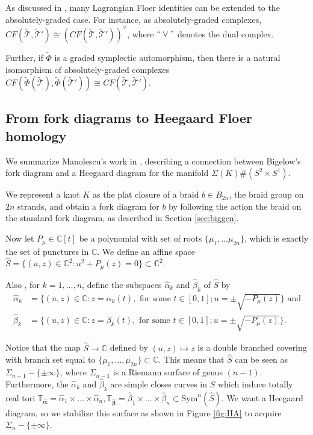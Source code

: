 \documentclass[11pt]{article}
\theoremstyle{plain} \newtheorem{thm}{Theorem}[subsection]
\theoremstyle{plain} \newtheorem{cor}[thm]{Corollary}
\theoremstyle{plain} \newtheorem{prop}[thm]{Proposition}
\theoremstyle{plain} \newtheorem{conj}[thm]{Conjecture}
\theoremstyle{plain} \newtheorem{lem}[thm]{Lemma}
\theoremstyle{definition} \newtheorem{df}[thm]{Definition}
\theoremstyle{remark} \newtheorem{rmk}[thm]{Remark}
\theoremstyle{remark} \newtheorem{obs}[thm]{Observation}
\newcommand{\B}[1]{B_{#1} }
\newcommand{\DBCs}[1]{\Sigma(#1)\#(S^{2}\times S^{1})}
\newcommand{\tld}[1]{\widetilde{#1}}
\newcommand{\ah}{\widehat{\alpha}}
\newcommand{\bh}{\widehat{\beta}}
\newcommand{\ba}{\boldsymbol{\alpha}}
\newcommand{\bb}{\boldsymbol{\beta}}
\newcommand{\bah}{\widehat{\ba}}
\newcommand{\bbh}{\widehat{\bb}}
\newcommand{\Tah}{\mathbb{T}_{\bah}}
\newcommand{\Tbh}{\mathbb{T}_{\bbh}}
\begin{document}
As discussed in \cite{s:GL}, many Lagrangian Floer identities can be extended to the absolutely-graded case.  For instance, as absolutely-graded complexes, $CF(\tld{\mathcal{T}}, \tld{\mathcal{T}}') \cong \left(CF(\tld{\mathcal{T}}, \tld{\mathcal{T}}')\right)^{\vee}$, where $``\vee"$ denotes the dual complex.

Further, if $\tld{\Phi}$ is a graded symplectic automorphism, then there is a natural isomorphism of absolutely-graded complexes $CF(\tld{\Phi}(\tld{\mathcal{T}}), \tld{\Phi} (\tld{\mathcal{T}}')) \cong CF(\tld{\mathcal{T}}, \tld{\mathcal{T}}')$.
\subsection{From fork diagrams to Heegaard Floer homology}\label{sec:bighf}

We summarize Manolescu's work in \cite{cm:R}, describing a connection between Bigelow's fork diagram and a Heegaard diagram for the manifold $\DBCs{K}$.

We represent a knot $K$ as the plat closure of a braid $b \in \B{2n}$, the braid group on $2n$ strands, and obtain a fork diagram for $b$ by following the action the braid on the standard fork diagram, as described in Section \ref{sec:biggen}.

Now let $P_{\mu} \in \mathbb{C}[t]$ be a polynomial with set of roots $\{ \mu_{1} , \ldots \mu_{2n}\}$, which is exactly the set of punctures in $\mathbb{C}$.  We define an affine space $\widehat{S} = \{ (u, z) \in \mathbb{C}^{2} : u^{2} + P_{\mu}(z) = 0 \} \subset \mathbb{C}^{2}$.

Also , for $k = 1, \ldots , n$, define the subspaces $\ah_{k}$ and $\bh_{k}$ of $\widehat{S}$ by
\begin{align*}
\ah_{k} &= \{ (u,z) \in \mathbb{C} : z = \alpha_{k}(t),\text{ for some } t\in [0,1]; u = \pm \sqrt{-P_{\mu}(z)}\} \text{ and}\\
\bh_{k} &= \{ (u,z) \in \mathbb{C} : z = \beta_{k}(t),\text{ for some } t\in [0,1]; u = \pm \sqrt{-P_{\mu}(z)} \}.
\end{align*}

Notice that the map $\widehat{S} \rightarrow \mathbb{C}$  defined by $(u,z) \mapsto z$ is a double branched covering with branch set equal to $\{\mu_{1}, \ldots, \mu_{2n}\} \subset \mathbb{C}$.  This means that $\widehat{S}$ can be seen as $\Sigma_{n-1} - \{ \pm \infty \}$, where $\Sigma_{n-1}$ is a Riemann surface of genus $(n-1)$.  Furthermore, the $\ah_{k}$ and $\bh_{k}$ are simple closes curves in $\widehat{S}$ which induce totally real tori $\Tah = \ah_{1} \times \ldots \times \ah_{n}, \Tbh = \bh_{1}\times\ldots\times\bh_{n} \subset \text{Sym}^{n}\left( \widehat{S} \right)$.  We want a Heegaard diagram, so we stabilize this surface as shown in Figure \ref{fig:HA} to acquire $\Sigma_{n} - \{ \pm \infty \}$.
 
\end{document}
